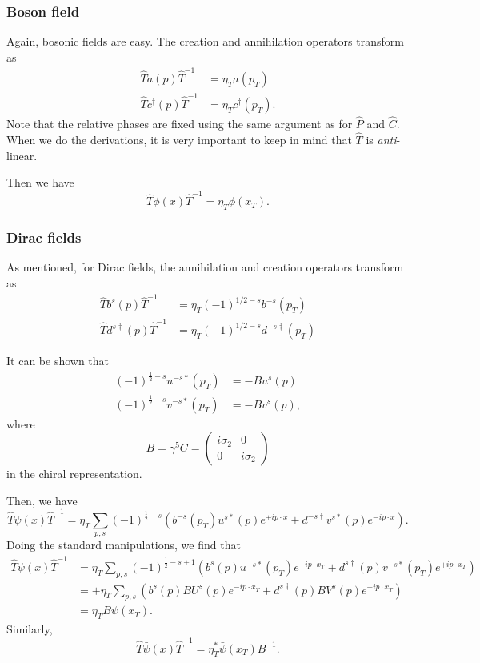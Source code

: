 \documentclass[a4paper]{article}
\begin{document}
\subsubsection*{Boson field}
Again, bosonic fields are easy. The creation and annihilation operators transform as
\begin{align*}
  \hat{T} a(p) \hat{T}^{-1} &= \eta_T a(p_T)\\
  \hat{T} c^\dagger(p) \hat{T}^{-1} &= \eta_T c^\dagger(p_T).
\end{align*}
Note that the relative phases are fixed using the same argument as for $\hat{P}$ and $\hat{C}$. When we do the derivations, it is very important to keep in mind that $\hat{T}$ is \emph{anti}-linear.

Then we have
\[
  \hat{T}\phi(x) \hat{T}^{-1} = \eta_T \phi(x_T).
\]
\subsubsection*{Dirac fields}
As mentioned, for Dirac fields, the annihilation and creation operators transform as
\begin{align*}
  \hat{T} b^s(p) \hat{T}^{-1} &= \eta_T (-1)^{1/2 - s} b^{-s}(p_T)\\
  \hat{T} d^{s\dagger}(p) \hat{T}^{-1} &= \eta_T (-1)^{1/2 - s} d^{-s\dagger}(p_T)
\end{align*}

It can be shown that
\begin{align*}
  (-1)^{\frac{1}{2} - s} u^{-s*}(p_T) &= -B u^s(p)\\
  (-1)^{\frac{1}{2} - s} v^{-s*}(p_T) &= -B v^s(p),
\end{align*}
where
\[
  B = \gamma^5 C =
  \begin{pmatrix}
    i\sigma_2 & 0\\
    0 & i \sigma_2
  \end{pmatrix}
\]
in the chiral representation.

Then, we have
\[
  \hat{T} \psi(x) \hat{T}^{-1} = \eta_T \sum_{p, s} (-1)^{\frac{1}{2} - s} \left(b^{-s}(p_T) u^{s*}(p) e^{+ip\cdot x} + d^{-s\dagger} v^{s*}(p) e^{-ip\cdot x}\right).
\]
Doing the standard manipulations, we find that
\begin{align*}
  \hat{T} \psi(x) \hat{T}^{-1} &= \eta_T \sum_{p, s} (-1)^{\frac{1}{2} - s + 1} \left(b^s(p) u^{-s*}(p_T) e^{-ip\cdot x_T} + d^{s\dagger}(p) v^{-s*}(p_T) e^{+ip\cdot x_T}\right)\\
  &= +\eta_T \sum_{p, s} \left(b^s(p) BU^s(p) e^{-ip\cdot x_T} + d^{s\dagger} (p) BV^s(p) e^{+ip\cdot x_T}\right)\\
  &= \eta_T B \psi(x_T).
\end{align*}
Similarly,
\[
  \hat{T}\bar\psi(x) \hat{T}^{-1} = \eta_T^* \bar\psi(x_T) B^{-1}.
\]
\end{document}
